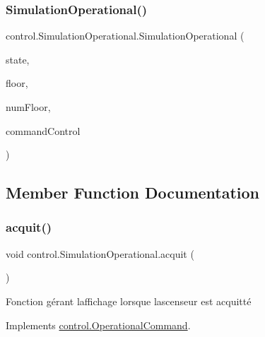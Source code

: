 \subsubsection{\texorpdfstring{SimulationOperational()}{SimulationOperational()}}
{\footnotesize\ttfamily control.\+Simulation\+Operational.\+Simulation\+Operational (\begin{DoxyParamCaption}\item[{J\+Text\+Field}]{state,  }\item[{J\+Text\+Field}]{floor,  }\item[{int}]{num\+Floor,  }\item[{\mbox{\hyperlink{interfacecontrol_1_1_command_control}{Command\+Control}}}]{command\+Control }\end{DoxyParamCaption})}



\subsection{Member Function Documentation}
\mbox{\label{classcontrol_1_1_simulation_operational_a66881a9f2cf8526dee93b756f8ad47af}} 
\subsubsection{\texorpdfstring{acquit()}{acquit()}}
{\footnotesize\ttfamily void control.\+Simulation\+Operational.\+acquit (\begin{DoxyParamCaption}{ }\end{DoxyParamCaption})}

Fonction gérant l\textquotesingle{}affichage lorsque l\textquotesingle{}ascenseur est acquitté 

Implements \mbox{\hyperlink{interfacecontrol_1_1_operational_command_ab48776483b91f60855a69d7671e02446}{control.\+Operational\+Command}}.

\mbox{\label{classcontrol_1_1_simulation_operational_a9cce36fe391bc34c0b5bdbbef9244f05}} 
